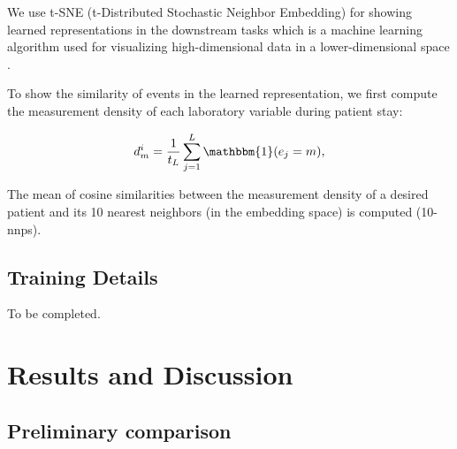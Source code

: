 \documentclass[journal,twoside,web]{ieeecolor}
\begin{document}
We use t-SNE (t-Distributed Stochastic Neighbor Embedding) for showing learned representations in the downstream tasks which is a machine learning algorithm used for visualizing high-dimensional data in a lower-dimensional space \cite*{maatenVisualizingDataUsing2008}.

To show the similarity of events in the learned representation, we first compute the measurement density of each laboratory variable during patient stay:

\begin{equation}
    d_{m}^{i}=  \frac{1}{t_L} \sum_{j=1}^{L} \mathbbm{1}(e_j=m),
\end{equation}

The mean of cosine similarities between the measurement density of a desired patient and its 10 nearest neighbors (in the embedding space) is computed (10-nnps).
\subsection*{Training Details}
To be completed.


\section{Results and Discussion}
\label{sec:Results and Discussion}



\subsection{Preliminary comparison}
\end{document}
